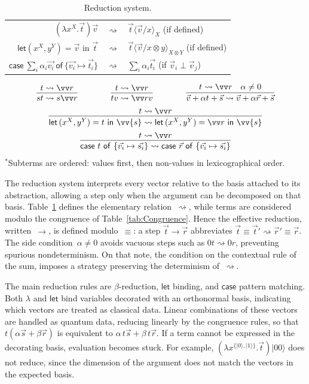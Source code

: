 \documentclass[a4paper,UKenglish,numberwithinsect,pdfa,anonymous]{lipics-v2021}
\theoremstyle{restatestyle}
\newcommand\ket[1]{\ensuremath{|#1\rangle}}
\newcommand\lra{\longrightarrow}
\def\Pair#1#2{(#1,#2)} %
\def\Lam#1#2#3{\lambda#1^{#2}{.}#3} %
\def\letkeyword{\mathsf{let}}
\def\inkeyword{\mathsf{in}}
\def\LetP#1#2#3#4#5#6{\letkeyword\,\Pair{#1^{#2}}{#3^{#4}}=#5~\inkeyword~#6}
\def\gencasei#1#2#3{\ensuremath{\mathsf{case}~#1~\mathsf{of}~\{#2\mapsto #3\}}}
\def\lraneq{\rightsquigarrow}
\begin{document}
\begin{table}[t]
  \centering
  \begin{tabular}{r@{~}c@{~}l}
    $(\lambda x^X.\vec{t})\vec{v}$ & $\lraneq$ & $\vec{t}\langle\vec{v}/x\rangle_X$ \hfill (if defined) \\
    $\mathsf{let} (x^X, y^Y) = \vec{v} \text{ in } \vec{t}$ & $\lraneq$ & $\vec{t}\langle\vec{v}/x \otimes y\rangle_{X \otimes Y}$ \hfill (if defined) \\
    $\gencasei{\sum_{i}\alpha_i \vec{v_i}}{\vec{v_i}}{\vec{t_i}}$ & $\lraneq$ & $\sum_{i}\alpha_i \vec{t_i}$ \hfill (if $\vec{v}_i \perp \vec{v}_j$) \\
  \end{tabular}
  \[
    \begin{array}{c}
      \infer{st\lraneq s\vv r}{t\lraneq \vv r}
      \qquad\qquad
      \infer{tv\lraneq \vv rv}{t\lraneq\vv r}
      \qquad\qquad
      \infer{\vec v+\alpha t+\vec s \lraneq \vec v+\alpha \vec r+\vec s}{t\lraneq\vv r & \alpha\neq 0}
      \\[5pt]
      \infer{\LetP{x}{X}{y}{Y}{t}{\vv{s}}\lraneq
      \LetP{x}{X}{y}{Y}{\vv r}{\vv{s}}}{t\lraneq \vv r} 
      \\[5pt]
      \infer{
        \gencasei{t}{\vec{v_i}}{\vec{s_i}} \lraneq 
        \gencasei{\vec r}{\vec{v_i}}{\vec{s_i}}}
      {t\lraneq \vv r}
    \end{array}
  \]
  \noindent\footnotesize $^*$Subterms are ordered: values first, then non-values in lexicographical order.
  \caption{Reduction system.}
  \label{tab:Reduction}
\end{table}
The reduction system interprets every vector relative to the basis attached to
its abstraction, allowing a step only when the argument can be decomposed on
that basis.  
Table~\ref{tab:Reduction} defines the elementary relation~$\lraneq$, while terms are
considered modulo the congruence of Table~\ref{tab:Congruence}.  
Hence the effective reduction, written~$\lra$, is defined modulo~$\equiv$:
a step $\vec t\lra\vec r$ abbreviates $\vec t\equiv\vec t'\lraneq\vec r'\equiv\vec r$.
The side condition~$\alpha\neq0$ avoids vacuous steps such as
$0t\lraneq0r$, preventing spurious nondeterminism. On that note,
the condition on the contextual rule of the sum, imposes a strategy
preserving the determinism of~$\lraneq$.

The main reduction rules are $\beta$-reduction, $\mathsf{let}$ binding, and
$\mathsf{case}$ pattern matching.  
Both $\lambda$ and $\mathsf{let}$ bind variables decorated with an orthonormal
basis, indicating which vectors are treated as classical data.  Linear
combinations of these vectors are handled as quantum data, reducing linearly by
the congruence rules, so that $t(\alpha\vec s+\beta\vec r)$ is equivalent to
$\alpha\,t\vec s+\beta\,t\vec r$. If a term cannot be expressed in the decorating
basis, evaluation becomes stuck. For example, $(\Lam{x}{\{\ket{0},\ket{1}\}}{\vec{t}})
\ket{00}$ does not reduce, since the dimension of the argument does
not match the vectors in the expected basis.
\end{document}
